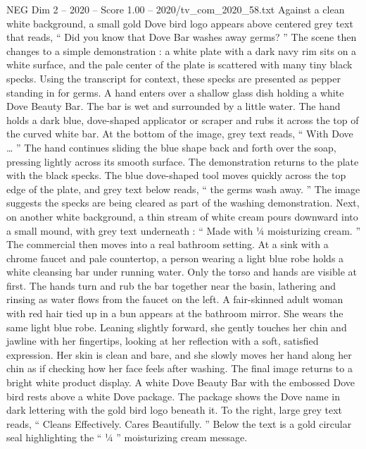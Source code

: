 \begin{textsample}{NEG Dim 2 – 2020 – Score 1.00 – 2020/tv\_com\_2020\_58.txt}  \label{ex:f2_neg_056}
Against a clean white background, a small gold Dove bird logo appears above centered grey text that reads, “ Did you know that Dove Bar washes away germs? ” The scene then changes to a simple demonstration : a white plate with a dark navy rim sits on a white surface, and the pale center of the plate is scattered with many tiny black specks.
Using the transcript for context, these specks are presented as pepper standing in for germs.
A hand enters over a shallow glass dish holding a white Dove Beauty Bar.
The bar is wet and surrounded by a little water.
The hand holds a dark blue, dove-shaped applicator or scraper and rubs it across the top of the curved white bar.
At the bottom of the image, grey text reads, “ With Dove … ” The hand continues sliding the blue shape back and forth over the soap, pressing lightly across its smooth surface.
The demonstration returns to the plate with the black specks.
The blue dove-shaped tool moves quickly across the top edge of the plate, and grey text below reads, “ the germs wash away. ” The image suggests the specks are being cleared as part of the washing demonstration.
Next, on another white background, a thin stream of white cream pours downward into a small mound, with grey text underneath : “ Made with ¼ moisturizing cream. ” The commercial then moves into a real bathroom setting.
At a sink with a chrome faucet and pale countertop, a person wearing a light blue robe holds a white cleansing bar under running water.
Only the torso and hands are visible at first.
The hands turn and rub the bar together near the basin, lathering and rinsing as water flows from the faucet on the left.
A fair-skinned adult woman with red hair tied up in a bun appears at the bathroom mirror.
She wears the same light blue robe.
Leaning slightly forward, she gently touches her chin and jawline with her fingertips, looking at her reflection with a soft, satisfied expression.
Her skin is clean and bare, and she slowly moves her hand along her chin as if checking how her face feels after washing.
The final image returns to a bright white product display.
A white Dove Beauty Bar with the embossed Dove bird rests above a white Dove package.
The package shows the Dove name in dark lettering with the gold bird logo beneath it.
To the right, large grey text reads, “ Cleans Effectively.
Cares Beautifully. ” Below the text is a gold circular seal highlighting the “ ¼ ” moisturizing cream message.

\end{textsample}
